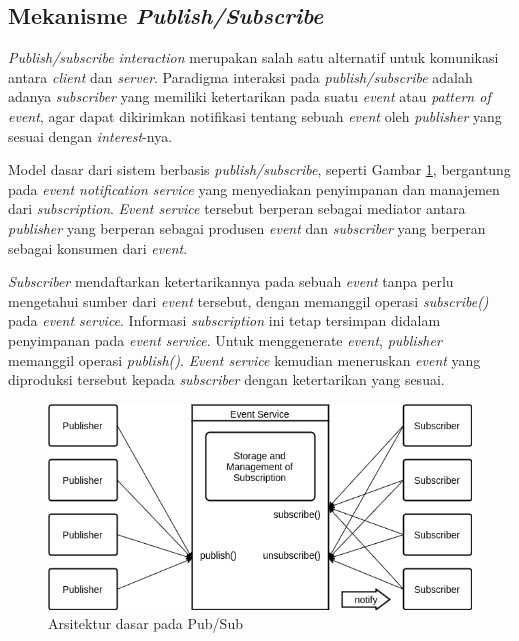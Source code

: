 \subsection{Mekanisme \textit{Publish/Subscribe}}
\label{ssec:pub-sub-mechanism}
\textit{Publish/subscribe interaction} merupakan salah satu alternatif untuk komunikasi antara \textit{client} dan \textit{server}. Paradigma interaksi pada \textit{publish/subscribe} adalah adanya \textit{subscriber} yang memiliki ketertarikan pada suatu \textit{event} atau \textit{pattern of event}, agar dapat dikirimkan notifikasi tentang sebuah \textit{event} oleh \textit{publisher} yang sesuai dengan \textit{interest}-nya.


Model dasar dari sistem berbasis \textit{publish/subscribe}, seperti Gambar \ref{fig:pub-sub-general}, bergantung pada \textit{event notification service} yang menyediakan penyimpanan dan manajemen dari \textit{subscription}. \textit{Event service} tersebut berperan sebagai mediator antara \textit{publisher} yang berperan sebagai produsen \textit{event} dan \textit{subscriber} yang berperan sebagai konsumen dari \textit{event}. 


\textit{Subscriber} mendaftarkan ketertarikannya pada sebuah \textit{event} tanpa perlu mengetahui sumber dari \textit{event} tersebut, dengan memanggil operasi \textit{subscribe()} pada \textit{event service}. Informasi \textit{subscription} ini tetap tersimpan didalam penyimpanan pada \textit{event service}. Untuk menggenerate \textit{event}, \textit{publisher} memanggil operasi \textit{publish()}. \textit{Event service} kemudian meneruskan \textit{event} yang diproduksi tersebut kepada \textit{subscriber} dengan ketertarikan yang sesuai.


\begin{figure}[!]
	\centering
	\includegraphics[width=\textwidth]{Resources/Images/pub-sub-general}
	\caption{Arsitektur dasar pada Pub/Sub \citep{eugster_many_2003}}
	\label{fig:pub-sub-general}
\end{figure}


